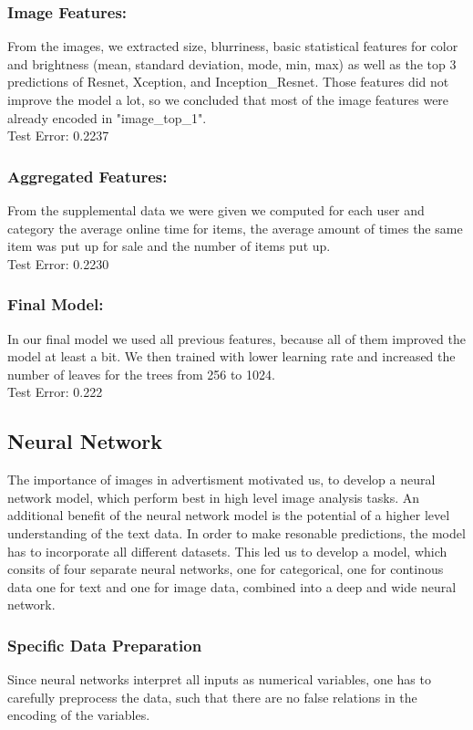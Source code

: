 \documentclass[runningheads]{llncs}
\begin{document}
\subsubsection{Image Features:} From the images, we extracted size, blurriness, basic statistical features for color and brightness (mean, standard deviation, mode, min, max) as well as the top 3 predictions of Resnet, Xception, and Inception\_Resnet. Those features did not improve the model a lot, so we concluded that most of the image features were already encoded in "image\_top\_1".\\
Test Error: 0.2237 
\subsubsection{Aggregated Features:} From the supplemental data we were given we computed for each user and category the average online time for items, the average amount of times the same item was put up for sale and the number of items put up.\\
Test Error: 0.2230
\subsubsection{Final Model:} In our final model we used all previous features, because all of them improved the model at least a bit. We then trained with lower learning rate and increased the number of leaves for the trees from 256 to 1024.\\
Test Error: 0.222


\subsection{Neural Network}
 The importance of images in advertisment motivated us, to develop a neural network model, which perform best in high level image analysis tasks. An additional benefit of the neural network model is the potential of a higher level understanding of the text data. In order to make resonable predictions, the model has to incorporate all different datasets. This led us to develop a  model, which consits of four separate neural networks, one for categorical, one for continous data one for text and one for image data, combined into a deep and wide neural network.
 \subsubsection{Specific Data Preparation}
 Since neural networks interpret all inputs as numerical variables, one has to carefully preprocess the data, such that there are no false relations in the encoding of the variables.
\end{document}
